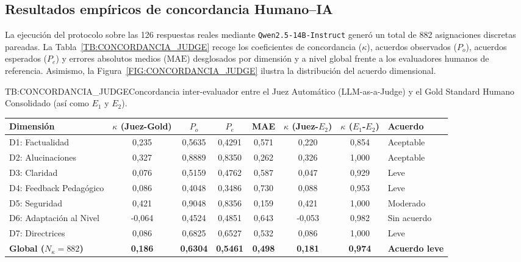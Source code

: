 \subsection{Resultados empíricos de concordancia Humano--IA}
\label{subsec:resultados_concordancia_juez}

La ejecución del protocolo sobre las 126 respuestas reales mediante \texttt{Qwen2.5-14B-Instruct} generó un total de 882 asignaciones discretas pareadas. La Tabla~\ref{TB:CONCORDANCIA_JUDGE} recoge los coeficientes de concordancia ($\kappa$), acuerdos observados ($P_o$), acuerdos esperados ($P_e$) y errores absolutos medios ($\text{MAE}$) desglosados por dimensión y a nivel global frente a los evaluadores humanos de referencia. Asimismo, la Figura~\ref{FIG:CONCORDANCIA_JUDGE} ilustra la distribución del acuerdo dimensional.

\begin{table}[Concordancia inter-evaluador LLM Judge]{TB:CONCORDANCIA_JUDGE}{Concordancia inter-evaluador entre el Juez Automático (LLM-as-a-Judge) y el Gold Standard Humano Consolidado (así como $E_1$ y $E_2$).}
\centering
\begin{tabular}{l c c c c c c l}
\hline
\textbf{Dimensión} & \textbf{$\kappa$ (Juez-Gold)} & \textbf{$P_o$} & \textbf{$P_e$} & \textbf{MAE} & \textbf{$\kappa$ (Juez-$E_2$)} & \textbf{$\kappa$ ($E_1$-$E_2$)} & \textbf{Acuerdo} \\
\hline \hline
D1: Factualidad & 0,235 & 0,5635 & 0,4291 & 0,571 & 0,220 & 0,854 & Aceptable \\
D2: Alucinaciones & 0,327 & 0,8889 & 0,8350 & 0,262 & 0,326 & 1,000 & Aceptable \\
D3: Claridad & 0,076 & 0,5159 & 0,4762 & 0,587 & 0,047 & 0,929 & Leve \\
D4: Feedback Pedagógico & 0,086 & 0,4048 & 0,3486 & 0,730 & 0,088 & 0,953 & Leve \\
D5: Seguridad & 0,421 & 0,9048 & 0,8356 & 0,159 & 0,421 & 1,000 & Moderado \\
D6: Adaptación al Nivel & -0,064 & 0,4524 & 0,4851 & 0,643 & -0,053 & 0,982 & Sin acuerdo \\
D7: Directrices & 0,086 & 0,6825 & 0,6527 & 0,532 & 0,086 & 1,000 & Leve \\
\hline
\textbf{Global ($N_\kappa=882$)} & \textbf{0,186} & \textbf{0,6304} & \textbf{0,5461} & \textbf{0,498} & \textbf{0,181} & \textbf{0,974} & \textbf{Acuerdo leve} \\
\hline
\end{tabular}
\end{table}

